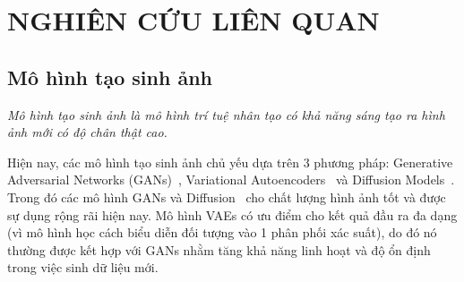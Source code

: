 \chapter{NGHIÊN CỨU LIÊN QUAN}
\label{Chapter2}

\section{Mô hình tạo sinh ảnh}
\textit{Mô hình tạo sinh ảnh là mô hình trí tuệ nhân tạo có khả năng sáng tạo ra hình ảnh mới có độ chân thật cao.}

Hiện nay, các mô hình tạo sinh ảnh chủ yếu dựa trên 3 phương pháp: Generative Adversarial Networks (GANs)~\cite{Goodfellow2014GenerativeAN}, Variational
 Autoencoders~\cite{Kingma2013AutoEncodingVB} và Diffusion Models~\cite{Ho2020DenoisingDP}. Trong đó các mô hình GANs\cite{Goodfellow2014GenerativeAN} và Diffusion~\cite{Ho2020DenoisingDP} cho chất lượng hình ảnh tốt và được sự dụng rộng rãi hiện nay. Mô hình VAEs có ưu điểm cho kết quả đầu ra đa dạng (vì mô hình học cách biểu diễn đối tượng vào 1 phân phối xác suất), do đó nó thường được kết hợp với GANs nhằm tăng khả năng linh hoạt và độ ổn định trong việc sinh dữ liệu mới.
